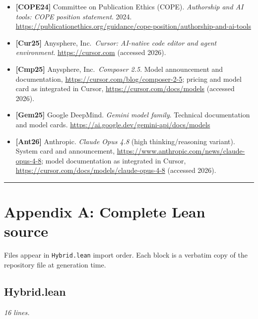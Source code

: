 \documentclass[11pt,a4paper]{article}
\renewcommand{\_}{\origtextunderscore\allowbreak}
\begin{document}
\begin{itemize}
  \begin{enumerate}
  \def\labelenumi{\arabic{enumi}.}
  \setcounter{enumi}{1948}
    \item
  \end{enumerate}
\item
  \textbf{{[}COPE24{]}} Committee on Publication Ethics (COPE). \emph{Authorship and AI tools: COPE position statement}. 2024. \url{https://publicationethics.org/guidance/cope-position/authorship-and-ai-tools}
\item
  \textbf{{[}Cur25{]}} Anysphere, Inc.~\emph{Cursor: AI-native code editor and agent environment}. \url{https://cursor.com} (accessed 2026).
\item
  \textbf{{[}Cmp25{]}} Anysphere, Inc.~\emph{Composer 2.5}. Model announcement and documentation, \url{https://cursor.com/blog/composer-2-5}; pricing and model card as integrated in Cursor, \url{https://cursor.com/docs/models} (accessed 2026).
\item
  \textbf{{[}Gem25{]}} Google DeepMind. \emph{Gemini model family}. Technical documentation and model cards. \url{https://ai.google.dev/gemini-api/docs/models}
\item
  \textbf{{[}Ant26{]}} Anthropic. \emph{Claude Opus 4.8} (high thinking/reasoning variant). System card and announcement, \url{https://www.anthropic.com/news/claude-opus-4-8}; model documentation as integrated in Cursor, \url{https://cursor.com/docs/models/claude-opus-4-8} (accessed 2026).
\end{itemize}

\begin{center}\rule{0.5\linewidth}{0.5pt}\end{center}

\hypertarget{appendix-a-complete-lean-source}{%
\section{Appendix A: Complete Lean source}\label{appendix-a-complete-lean-source}}

Files appear in \texttt{Hybrid.lean} import order. Each block is a verbatim copy of the repository file at generation time.

\hypertarget{hybrid.lean}{%
\subsection{Hybrid.lean}\label{hybrid.lean}}

\emph{16 lines.}
\end{document}
